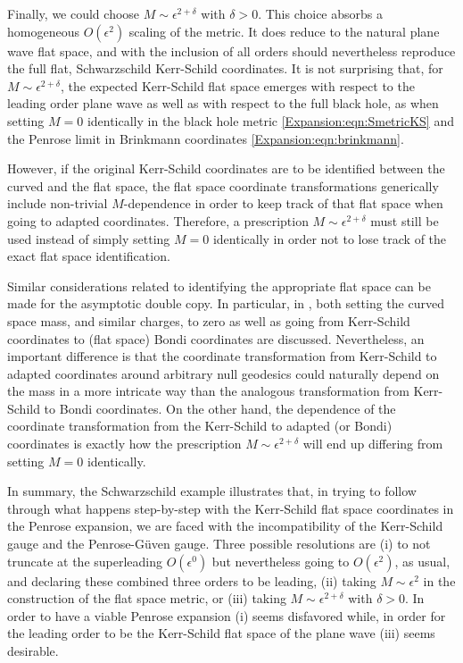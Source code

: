 Finally, we could choose $M \sim \epsilon^{2 + \delta}$ with $\delta > 0$. This choice absorbs a homogeneous $O(\epsilon^2)$ scaling of the metric. It does reduce to the natural plane wave flat space, and with the inclusion of all orders should nevertheless reproduce the full flat, Schwarzschild Kerr-Schild coordinates. It is not surprising that, for $M \sim \epsilon^{2 + \delta}$, the expected Kerr-Schild flat space emerges with respect to the leading order plane wave as well as with respect to the full black hole, as when setting $M=0$ identically in the black hole metric \eqref{Expansion:eqn:SmetricKS} and the Penrose limit in Brinkmann coordinates \eqref{Expansion:eqn:brinkmann}.

However, if the original Kerr-Schild coordinates are to be identified between the curved and the flat space, the flat space coordinate transformations generically include non-trivial $M$-dependence in order to keep track of that flat space when going to adapted coordinates. Therefore, a prescription $M \sim \epsilon^{2 + \delta}$ must still be used instead of simply setting $M = 0$ identically in order not to lose track of the exact flat space identification. 

Similar considerations related to identifying the appropriate flat space can be made for the asymptotic double copy. In particular, in \cite{Godazgar:2021iae}, both setting the curved space mass, and similar charges, to zero as well as going from Kerr-Schild coordinates to (flat space) Bondi coordinates are discussed. Nevertheless, an important difference is that the coordinate transformation from Kerr-Schild to adapted coordinates around arbitrary null geodesics could naturally depend on the mass in a more intricate way than the analogous transformation from Kerr-Schild to Bondi coordinates. On the other hand, the dependence of the coordinate transformation from the Kerr-Schild to adapted (or Bondi) coordinates is exactly how the prescription $M \sim \epsilon^{2 + \delta}$ will end up differing from setting $M = 0$ identically.

In summary, the Schwarzschild example illustrates that, in trying to follow through what happens step-by-step with the Kerr-Schild flat space coordinates in the Penrose expansion, we are faced with the incompatibility of the Kerr-Schild gauge and the Penrose-G\"uven gauge. Three possible resolutions are (i) to not truncate at the superleading $O(\epsilon^0)$ but nevertheless going to $O(\epsilon^2)$, as usual, and declaring these combined three orders to be leading, (ii) taking $M \sim \epsilon^2$ in the construction of the flat space metric, or (iii) taking $M \sim \epsilon^{2 + \delta}$ with $\delta > 0$. In order to have a viable Penrose expansion (i) seems disfavored while, in order for the leading order to be the Kerr-Schild flat space of the plane wave (iii) seems desirable.



